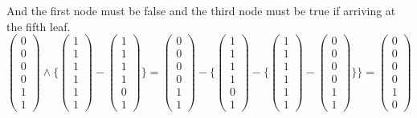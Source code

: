 \documentclass[UTF8]{article}
\begin{document}
And the first node must be false and the third node must be true if arriving at the fifth leaf.
\begin{equation}
\begin{pmatrix}
0\\ 0\\ 0\\ 0\\ 1\\1 \nonumber
\end{pmatrix}
\wedge
\{\begin{pmatrix}
1\\ 1\\ 1\\ 1\\ 1\\1 \nonumber
\end{pmatrix}-
\begin{pmatrix}
1\\ 1\\ 1\\ 1\\ 0\\1 \nonumber
\end{pmatrix}\}=
\begin{pmatrix}
0\\ 0\\ 0\\ 0\\ 1\\1 \nonumber
\end{pmatrix}-
\{\begin{pmatrix}
1\\ 1\\ 1\\ 1\\ 0\\1 \nonumber
\end{pmatrix}
-\{\begin{pmatrix}
1\\ 1\\ 1\\ 1\\ 1\\1 \nonumber
\end{pmatrix}
-\begin{pmatrix}
0\\ 0\\ 0\\ 0\\ 1\\1 \nonumber
\end{pmatrix}
\}\}
=
\begin{pmatrix}
0\\ 0\\ 0\\ 0\\ 1\\0 \nonumber
\end{pmatrix}
\end{equation}
\end{document}
